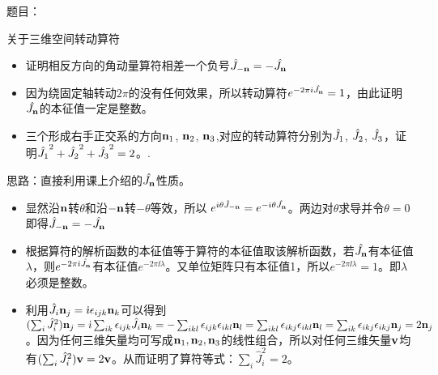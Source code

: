 \documentclass[CJK]{beamer}
\begin{document}
\begin{frame}
\bch
题目：
{\small 关于三维空间转动算符
\begin{itemize}
\item{证明相反方向的角动量算符相差一个负号$\hat{J}_{-{\mathbf{n}}} = - {\hat{J_{\mathbf{n}}}}$}
\item{因为绕固定轴转动$2\pi$的没有任何效果，所以转动算符$e^{-2\pi{\dot{\imath}}{\hat{J_{\mathbf{n}}}}}=1$，由此证明${\hat{J_{\mathbf{n}}}}$的本征值一定是整数。}
\item{三个形成右手正交系的方向${\mathbf{n}}_1$, ${\mathbf{n}}_2$, ${\mathbf{n}}_3$,对应的转动算符分别为$\hat{J_{1}} $, $\hat{J_{2}} $, $\hat{J_{3}}$，证明$\hat{J_{1}}^2+\hat{J_{2}}^2+\hat{J_{3}}^2 = 2$。.}
\end{itemize}
}

\skipline

思路：直接利用课上介绍的${\hat{J_{\mathbf{n}}}}$性质。
\ech
\end{frame}


\begin{frame}
\bch
\begin{itemize}
\item{显然沿${\mathbf{n}}$转$\theta$和沿$-{\mathbf{n}}$转$-\theta$等效，所以 $ e^{{\dot{\imath}} \theta \hat{J}_{-{\mathbf{n}}}}= e^{-{\dot{\imath}}\theta {\hat{J_{\mathbf{n}}}}}  $。两边对$\theta$求导并令$\theta = 0$即得$\hat{J}_{-{\mathbf{n}}} = - {\hat{J_{\mathbf{n}}}}$}
\item{根据算符的解析函数的本征值等于算符的本征值取该解析函数，若${\hat{J_{\mathbf{n}}}}$有本征值$\lambda$，则$e^{-2\pi{\dot{\imath}}{\hat{J_{\mathbf{n}}}}}$有本征值$e^{-2\pi\ii\lambda}$。又单位矩阵只有本征值1，所以$e^{-2\pi\ii\lambda}=1$。即$\lambda$必须是整数。}
\item{利用$\hat{J_{i}}{\mathbf{n}}_j = {\dot{\imath}}\epsilon_{ijk}{\mathbf{n}}_k$可以得到
$(\sum_i\hat{J}_i^2){\mathbf{n}}_{j} = {\dot{\imath}} \sum_{ik} \epsilon_{ijk} \hat{J}_i {\mathbf{n}}_k = -\sum_{ikl} \epsilon_{ijk}\epsilon_{ikl}{\mathbf{n}}_l =\sum_{ikl} \epsilon_{ikj}\epsilon_{ikl}{\mathbf{n}}_l = \sum_{ik} \epsilon_{ikj}\epsilon_{ikj}{\mathbf{n}}_j =2{\mathbf{n}}_j$。因为任何三维矢量均可写成${\mathbf{n}}_1,{\mathbf{n}}_2,{\mathbf{n}}_3$的线性组合，所以对任何三维矢量${\mathbf{v}}$均有$(\sum_i\hat{J}_i^2){\mathbf{v}} = 2{\mathbf{v}}$。从而证明了算符等式：$\sum_i\hat{J}_i^2 =2$。
}
\end{itemize}
\ech
\end{frame}
\end{document}
